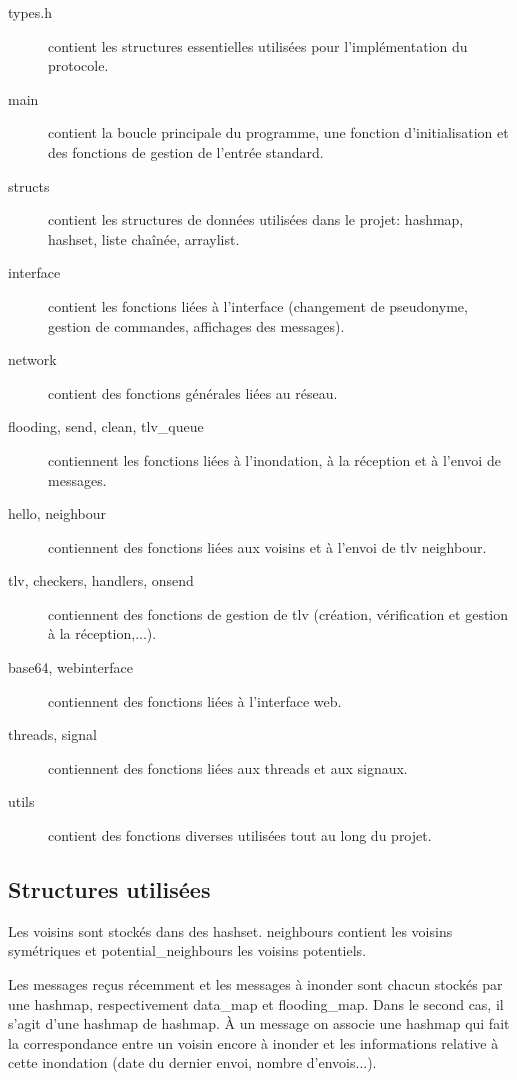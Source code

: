 \documentclass[a4paper,10pt]{article} %
\begin{document}
\begin{description}
\item[types.h] contient les structures essentielles utilisées pour l'implémentation du protocole.
\item[main] contient la boucle principale du programme, une fonction d'initialisation et des fonctions de gestion de l'entrée standard.
\item[structs] contient les structures de données utilisées dans le projet: hashmap, hashset, liste chaînée, arraylist.
\item[interface] contient les fonctions liées à l'interface (changement de pseudonyme, gestion de commandes, affichages des messages).
\item[network] contient des fonctions générales liées au réseau.
\item[flooding, send, clean, tlv\_queue] contiennent les fonctions liées à l'inondation, à la réception et à l'envoi de messages.
\item[hello, neighbour] contiennent des fonctions liées aux voisins et à l'envoi de tlv neighbour.
\item[tlv, checkers, handlers, onsend] contiennent des fonctions de gestion de tlv (création, vérification et gestion à la réception,...).
\item[base64, webinterface] contiennent des fonctions liées à l'interface web.
\item[threads, signal] contiennent des fonctions liées aux threads et aux signaux.
\item[utils] contient des fonctions diverses utilisées tout au long du projet.
\end{description}

\subsection{Structures utilisées\label{sec:struct}}
Les voisins sont stockés dans des hashset. \textrm{neighbours} contient les voisins symétriques et \textrm{potential\_neighbours} les voisins potentiels.

Les messages reçus récemment et les messages à inonder sont chacun stockés par une hashmap, respectivement \textrm{data\_map} et \textrm{flooding\_map}. Dans le second cas, il s'agit d'une hashmap de hashmap. À un message on associe une hashmap qui fait la correspondance entre un voisin encore à inonder et les informations relative à cette inondation (date du dernier envoi, nombre d'envois...).
\end{document}
